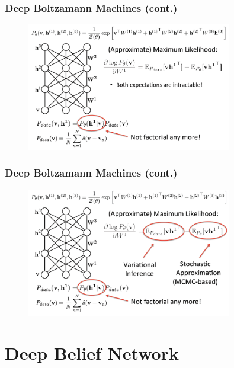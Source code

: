 \documentclass{beamer}
\begin{document}
\begin{frame}
\frametitle{Deep Boltzamann Machines (cont.)}
\begin{figure}
\centering
  \includegraphics[width=0.8\textwidth]{figs/p4.png}
\end{figure}
\end{frame}


\begin{frame}
\frametitle{Deep Boltzamann Machines (cont.)}
\begin{figure}
\centering
  \includegraphics[width=0.8\textwidth]{figs/p5.png}
\end{figure}
\end{frame}

\section{Deep Belief Network}
\end{document}
